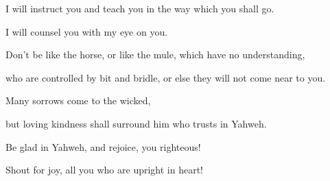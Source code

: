 {\Q {}I will instruct you and teach you in the way which you shall go.
\par }{\QB I will counsel you with my eye on you.
\par }{\Q {}Don’t be like the horse, or like the mule, which have no understanding,
\par }{\QB who are controlled by bit and bridle, or else they will not come near to you.
\par }{\Q {}Many sorrows come to the wicked,
\par }{\QB but loving kindness shall surround him who trusts in Yahweh.
\par }{\Q {}Be glad in Yahweh, and rejoice, you righteous!
\par }{\QB Shout for joy, all you who are upright in heart!

}
